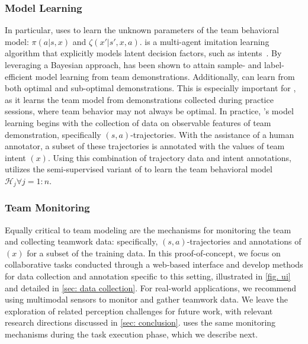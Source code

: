 \subsubsection{Model Learning}
In particular, \coach uses \btil to learn the unknown parameters of the team behavioral model: $\pi(a|s, x)$ and $\zeta(x'|s', x, a)$.
\btil is a multi-agent imitation learning algorithm that explicitly models latent decision factors, such as intents~\cite{seo2022semi}.
By leveraging a Bayesian approach, \btil has been shown to attain sample- and label- efficient model learning from team demonstrations.
Additionally, \btil can learn from both optimal and sub-optimal demonstrations.
This is especially important for \coach, as it learns the team model from demonstrations collected during practice sessions, where team behavior may not always be optimal.
In practice, \coach's model learning begins with the collection of data on observable features of team demonstration, specifically $(s,a)$-trajectories.
With the assistance of a human annotator, a subset of these trajectories is annotated with the values of team intent $(x)$.
Using this combination of trajectory data and intent annotations, \coach utilizes the semi-supervised variant of \btil to learn the team behavioral model $\mathcal{H}_j \forall j = 1:n$.

\subsubsection{Team Monitoring}
Equally critical to team modeling are the mechanisms for monitoring the team and collecting teamwork data: specifically, $(s,a)$-trajectories and annotations of $(x)$ for a subset of the training data. In this proof-of-concept, we focus on collaborative tasks conducted through a web-based interface and develop methods for data collection and annotation specific to this setting, illustrated in \cref{fig. ui} and detailed in \cref{sec: data collection}. For real-world applications, we recommend using multimodal sensors to monitor and gather teamwork data. We leave the exploration of related perception challenges for future work, with relevant research directions discussed in \cref{sec: conclusion}. \coach uses the same monitoring mechanisms during the task execution phase, which we describe next.

